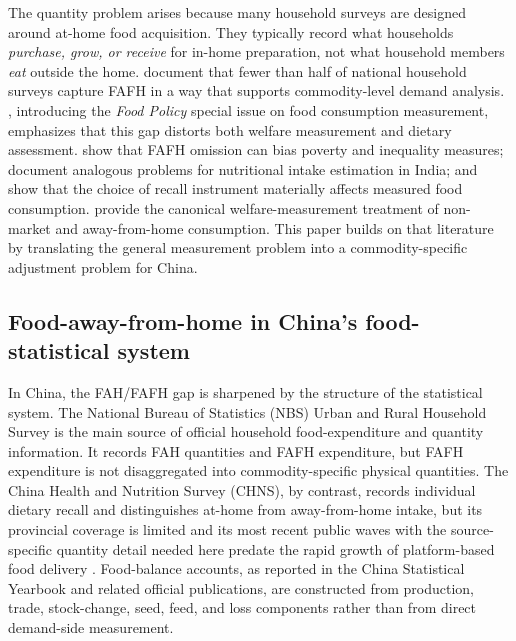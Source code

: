 \documentclass[preprint,12pt,authoryear]{elsarticle}
\begin{document}
The quantity problem arises because many household surveys are designed around at-home food acquisition. They typically record what households \emph{purchase, grow, or receive} for in-home preparation, not what household members \emph{eat} outside the home. \citet{SmithDupriezTroubat2014} document that fewer than half of national household surveys capture FAFH in a way that supports commodity-level demand analysis. \citet{Zezza2017}, introducing the \emph{Food Policy} special issue on food consumption measurement, emphasizes that this gap distorts both welfare measurement and dietary assessment. \citet{Farfan2017} show that FAFH omission can bias poverty and inequality measures; \citet{FiedlerYadav2017} document analogous problems for nutritional intake estimation in India; and \citet{ReitzigEtAl2023} show that the choice of recall instrument materially affects measured food consumption. \citet{DeatonZaidi2002} provide the canonical welfare-measurement treatment of non-market and away-from-home consumption. This paper builds on that literature by translating the general measurement problem into a commodity-specific adjustment problem for China.

\subsection{Food-away-from-home in China's food-statistical system}

In China, the FAH/FAFH gap is sharpened by the structure of the statistical system. The National Bureau of Statistics (NBS) Urban and Rural Household Survey is the main source of official household food-expenditure and quantity information. It records FAH quantities and FAFH expenditure, but FAFH expenditure is not disaggregated into commodity-specific physical quantities. The China Health and Nutrition Survey (CHNS), by contrast, records individual dietary recall and distinguishes at-home from away-from-home intake, but its provincial coverage is limited and its most recent public waves with the source-specific quantity detail needed here predate the rapid growth of platform-based food delivery \citep{Popkin2010CHNS}. Food-balance accounts, as reported in the China Statistical Yearbook and related official publications, are constructed from production, trade, stock-change, seed, feed, and loss components rather than from direct demand-side measurement.
\end{document}
